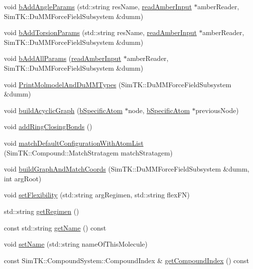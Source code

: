 \begin{DoxyCompactItemize}
\item 
void \hyperlink{classTopology_ac8b71a6aa2d8841cf2ad5f477eca2c70}{b\+Add\+Angle\+Params} (std\+::string res\+Name, \hyperlink{classreadAmberInput}{read\+Amber\+Input} $\ast$amber\+Reader, Sim\+T\+K\+::\+Du\+M\+M\+Force\+Field\+Subsystem \&dumm)
\item 
void \hyperlink{classTopology_ac082c73c8c91fa0f2c1d495f9e25f367}{b\+Add\+Torsion\+Params} (std\+::string res\+Name, \hyperlink{classreadAmberInput}{read\+Amber\+Input} $\ast$amber\+Reader, Sim\+T\+K\+::\+Du\+M\+M\+Force\+Field\+Subsystem \&dumm)
\item 
void \hyperlink{classTopology_a86ba17c55f8e311e0c0bcdba0c773da4}{b\+Add\+All\+Params} (\hyperlink{classreadAmberInput}{read\+Amber\+Input} $\ast$amber\+Reader, Sim\+T\+K\+::\+Du\+M\+M\+Force\+Field\+Subsystem \&dumm)
\item 
void \hyperlink{classTopology_a006cabf04e985e41f99b542904873ea0}{Print\+Molmodel\+And\+Du\+M\+M\+Types} (Sim\+T\+K\+::\+Du\+M\+M\+Force\+Field\+Subsystem \&dumm)
\item 
void \hyperlink{classTopology_a5a1fc33dd5965dd88f4e1b2d3f05b4dd}{build\+Acyclic\+Graph} (\hyperlink{classbSpecificAtom}{b\+Specific\+Atom} $\ast$node, \hyperlink{classbSpecificAtom}{b\+Specific\+Atom} $\ast$previous\+Node)
\item 
void \hyperlink{classTopology_a320ba4dbab67b1f1b810af4a23295143}{add\+Ring\+Closing\+Bonds} ()
\item 
void \hyperlink{classTopology_af493c145670b5362e58a17c87578fdb4}{match\+Default\+Configuration\+With\+Atom\+List} (Sim\+T\+K\+::\+Compound\+::\+Match\+Stratagem match\+Stratagem)
\item 
void \hyperlink{classTopology_a6185bfb169312e23495c94d54a06112e}{build\+Graph\+And\+Match\+Coords} (Sim\+T\+K\+::\+Du\+M\+M\+Force\+Field\+Subsystem \&dumm, int arg\+Root)
\item 
void \hyperlink{classTopology_a182953ce5f2024dc7a14cc68d4be8597}{set\+Flexibility} (std\+::string arg\+Regimen, std\+::string flex\+FN)
\item 
std\+::string \hyperlink{classTopology_a46d0c376fc14d523702db4e6c20d4311}{get\+Regimen} ()
\item 
const std\+::string \hyperlink{classTopology_a2c011e0bf248dd9329320e00fac4dcaa}{get\+Name} () const 
\item 
void \hyperlink{classTopology_ab94527095d261a020eec893e45c133fe}{set\+Name} (std\+::string name\+Of\+This\+Molecule)
\item 
const Sim\+T\+K\+::\+Compound\+System\+::\+Compound\+Index \& \hyperlink{classTopology_a8da806d0cc5d7e3c5debe6d48bd10d06}{get\+Compound\+Index} () const 

\end{DoxyCompactItemize}
